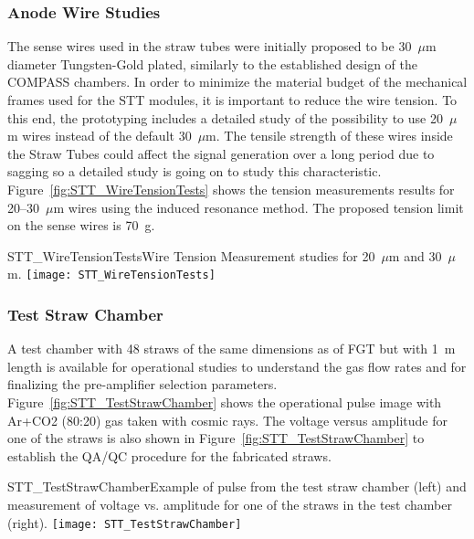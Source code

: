 \subsubsection{Anode Wire Studies} 

The sense wires used in the straw tubes were initially proposed to be
30~$\mu$m diameter Tungsten-Gold plated, similarly to the established
design of the COMPASS chambers. In order to minimize the material
budget of the mechanical frames used for the STT modules, it is
important to reduce the wire tension. To this end, the prototyping
includes a detailed study of the possibility to use 20~$\mu$m wires
instead of the default 30~$\mu$m. The tensile strength of these wires
inside the Straw Tubes could affect the signal generation over a long
period due to sagging so a detailed study is going on to study this
characteristic. Figure~\ref{fig:STT_WireTensionTests} shows the
tension measurements results for 20--30~$\mu$m wires using the induced
resonance method.  The proposed tension limit on the sense wires is
70~g.
\begin{cdrfigure}           
{STT_WireTensionTests}{Wire Tension Measurement studies for 20~$\mu$m and 30~$\mu$m.}
\texttt{[image: STT\_WireTensionTests]}
\end{cdrfigure}


\subsubsection{Test Straw Chamber} 

A test chamber with 48 straws of the same dimensions as of FGT but
with 1~m length is available for operational studies to understand
the gas flow rates and for finalizing the pre-amplifier selection
parameters.  Figure~\ref{fig:STT_TestStrawChamber} shows the
operational pulse image with Ar+CO2 (80:20) gas taken with cosmic
rays. The voltage versus amplitude for one of the straws is also shown
in Figure~\ref{fig:STT_TestStrawChamber} to establish the QA/QC
procedure for the fabricated straws.
\begin{cdrfigure}  
{STT_TestStrawChamber}{Example of pulse from the test straw chamber (left) and 
measurement of voltage vs. amplitude for one of the straws in the test chamber (right).}
\texttt{[image: STT\_TestStrawChamber]}
\end{cdrfigure}


